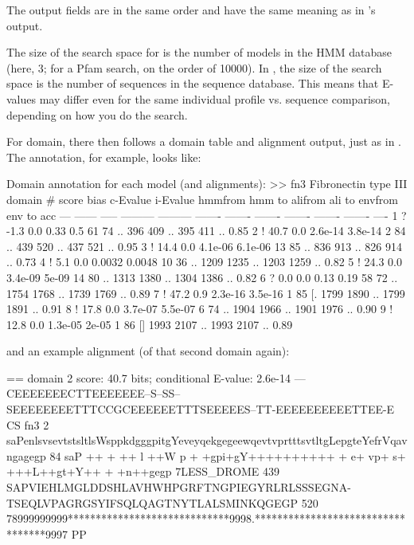 The output fields are in the same order and have the same meaning as
in 's output. 

The size of the search space for  is the number of
models in the HMM database (here, 3; for a Pfam search, on the order
of 10000). In , the size of the search space is the
number of sequences in the sequence database. This means that E-values
may differ even for the same individual profile vs. sequence
comparison, depending on how you do the search.

For domain, there then follows a domain table and alignment output,
just as in . The  annotation, for example,
looks like:

\begin{samepage}
\begin{sreoutput}
Domain annotation for each model (and alignments):
>> fn3  Fibronectin type III domain
   #    score  bias  c-Evalue  i-Evalue hmmfrom  hmm to    alifrom  ali to    envfrom  env to     acc
 ---   ------ ----- --------- --------- ------- -------    ------- -------    ------- -------    ----
   1 ?   -1.3   0.0      0.33       0.5      61      74 ..     396     409 ..     395     411 .. 0.85
   2 !   40.7   0.0   2.6e-14   3.8e-14       2      84 ..     439     520 ..     437     521 .. 0.95
   3 !   14.4   0.0   4.1e-06   6.1e-06      13      85 ..     836     913 ..     826     914 .. 0.73
   4 !    5.1   0.0    0.0032    0.0048      10      36 ..    1209    1235 ..    1203    1259 .. 0.82
   5 !   24.3   0.0   3.4e-09     5e-09      14      80 ..    1313    1380 ..    1304    1386 .. 0.82
   6 ?    0.0   0.0      0.13      0.19      58      72 ..    1754    1768 ..    1739    1769 .. 0.89
   7 !   47.2   0.9   2.3e-16   3.5e-16       1      85 [.    1799    1890 ..    1799    1891 .. 0.91
   8 !   17.8   0.0   3.7e-07   5.5e-07       6      74 ..    1904    1966 ..    1901    1976 .. 0.90
   9 !   12.8   0.0   1.3e-05     2e-05       1      86 []    1993    2107 ..    1993    2107 .. 0.89
\end{sreoutput}
\end{samepage}

and an example alignment (of that second domain again):

\begin{samepage}
\begin{sreoutput}
  == domain 2  score: 40.7 bits;  conditional E-value: 2.6e-14
                  ---CEEEEEEECTTEEEEEEE--S--SS--SEEEEEEEETTTCCGCEEEEEETTTSEEEEES--TT-EEEEEEEEEETTEE-E CS
          fn3   2 saPenlsvsevtstsltlsWsppkdgggpitgYeveyqekgegeewqevtvprtttsvtltgLepgteYefrVqavngagegp 84 
                  saP   ++ +  ++ l ++W p +  +gpi+gY++++++++++  + e+ vp+   s+ +++L++gt+Y++ +  +n++gegp
  7LESS_DROME 439 SAPVIEHLMGLDDSHLAVHWHPGRFTNGPIEGYRLRLSSSEGNA-TSEQLVPAGRGSYIFSQLQAGTNYTLALSMINKQGEGP 520
                  78999999999*****************************9998.**********************************9997 PP
\end{sreoutput}
\end{samepage}


